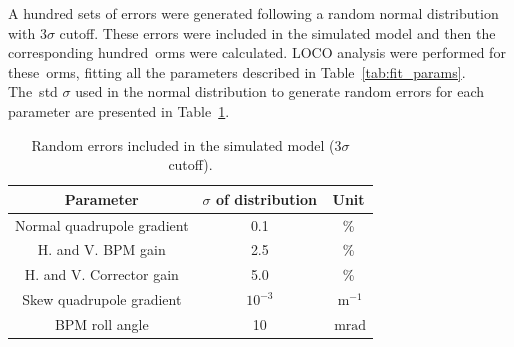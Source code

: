 A hundred sets of errors were generated following a random normal distribution with $3\sigma$ cutoff. These errors were included in the simulated model and then the corresponding hundred~\gls{orm}s were calculated. LOCO analysis were performed for these~\gls{orm}s, fitting all the parameters described in Table~\ref{tab:fit_params}. The~\gls{std} $\sigma$ used in the normal distribution to generate random errors for each parameter are presented in Table~\ref{tab:errors}.
\begin{table}[h!]
    \centering
    \caption{Random errors included in the simulated model ($3\sigma$ cutoff).}
    \label{tab:errors}
    \begin{tabular}{ccc}
        \toprule\toprule
        Parameter & $\sigma$ of distribution & Unit\\ 
        \hline
        Normal quadrupole gradient & 0.1 &\% \\
        H. and V. BPM gain &  2.5 & \% \\
        H. and V. Corrector gain & 5.0 &\% \\
        Skew quadrupole gradient & $10^{-3}$ &$\SI{}{\meter^{-1}}$ \\
        BPM roll angle & 10 & $\SI{}{\milli\radian}$ \\ 
        \bottomrule\bottomrule
    \end{tabular}
\end{table}

